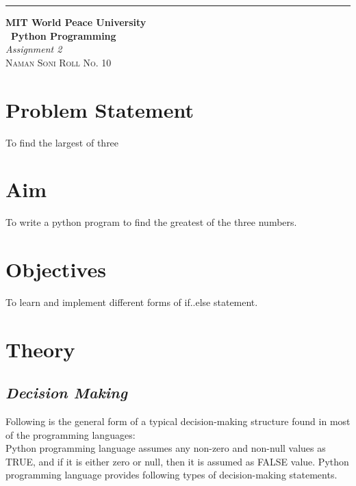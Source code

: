 \documentclass{article}
\begin{document}
\begin{titlepage} %
		
		\raggedleft\rule{1pt}{\textheight} %
		\hspace{0.05\textwidth} %
		\parbox[b]{0.75\textwidth}
		{ %
			
			{\Huge\bfseries MIT World Peace University \\[0.5\baselineskip] \ Python Programming}\\[2\baselineskip] %
			{\large\textit{Assignment 2}}\\[4\baselineskip] %
			{\Large\textsc{Naman Soni Roll No. 10}} %
			
			\vspace{0.5\textheight} %
		}
		
\end{titlepage}
	\tableofcontents
	\pagebreak
\section{\textbf{Problem Statement}}
To find the largest of three
\section{\textbf{Aim}}
To write a python program to find the greatest of the three numbers.
\section{\textbf{Objectives}}
To learn and implement different forms of if..else statement.
\section{\textbf{Theory}}
\subsection{\textbf{\textit{Decision Making}}}
Following is the general form of a typical decision-making structure found in most of the
programming languages: \\
Python programming language assumes any non-zero and non-null values as TRUE, and
if it is either zero or null, then it is assumed as FALSE value.
Python programming language provides following types of decision-making statements.
\end{document}
